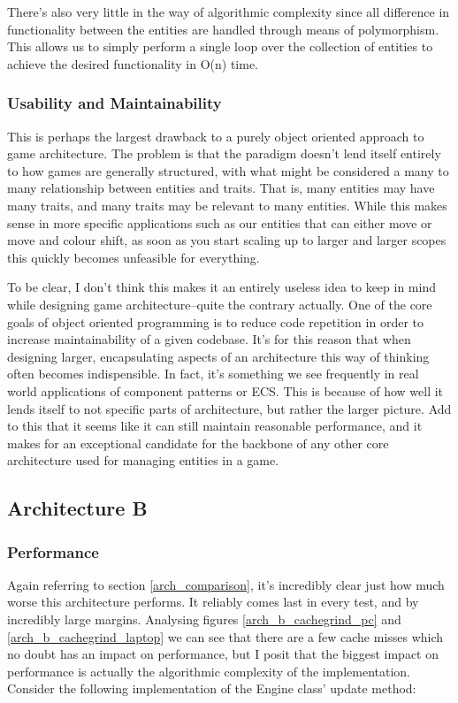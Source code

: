 \documentclass{article}
\begin{document}
There's also very little in the way of algorithmic complexity since all
difference in functionality between the entities are handled through means of
polymorphism. This allows us to simply perform a single loop over the collection
of entities to achieve the desired functionality in O(n) time.

\subsubsection{Usability and Maintainability}
This is perhaps the largest drawback to a purely object oriented approach to
game architecture. The problem is that the paradigm doesn't lend itself entirely
to how games are generally structured, with what might be considered a many to
many relationship between entities and traits. That is, many entities may
have many traits, and many traits may be relevant to many entities. While this
makes sense in more specific applications such as our entities that can either
move or move and colour shift, as soon as you start scaling up to larger and
larger scopes this quickly becomes unfeasible for everything.

To be clear, I don't think this makes it an entirely useless idea to keep in
mind while designing game architecture--quite the contrary actually. One of the
core goals of object oriented programming is to reduce code repetition in order
to increase maintainability of a given codebase. It's for this reason that when
designing larger, encapsulating aspects of an architecture this way of thinking
often becomes indispensible. In fact, it's something we see frequently in real
world applications of component patterns or ECS. This is because of how well it
lends itself to not specific parts of architecture, but rather the larger
picture. Add to this that it seems like it can still maintain reasonable
performance, and it makes for an exceptional candidate for the backbone of
any other core architecture used for managing entities in a game.

\subsection{Architecture B}
\subsubsection{Performance}
Again referring to section \ref{arch_comparison}, it's incredibly clear just
how much worse this architecture performs. It reliably comes last in every test,
and by incredibly large margins. Analysing figures \ref{arch_b_cachegrind_pc}
and \ref{arch_b_cachegrind_laptop} we can see that there are a few cache misses
which no doubt has an impact on performance, but I posit that the biggest impact
on performance is actually the algorithmic complexity of the implementation.
Consider the following implementation of the Engine class' update method:
\end{document}
